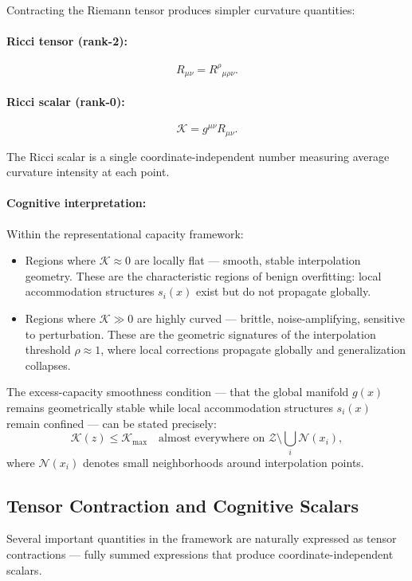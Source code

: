 \documentclass[12pt,a4paper]{article}
\begin{document}
Contracting the Riemann tensor produces simpler curvature quantities:

\paragraph{Ricci tensor (rank-2):}
\[
R_{\mu\nu} = R^\rho{}_{\mu\rho\nu}.
\]

\paragraph{Ricci scalar (rank-0):}
\[
\mathcal{K} = g^{\mu\nu} R_{\mu\nu}.
\]

The Ricci scalar is a single coordinate-independent number measuring average curvature intensity at each point.

\paragraph{Cognitive interpretation:} Within the representational capacity framework:
\begin{itemize}
\item Regions where $\mathcal{K} \approx 0$ are locally flat --- smooth, stable interpolation geometry. These are the characteristic regions of benign overfitting: local accommodation structures $s_i(x)$ exist but do not propagate globally.
\item Regions where $\mathcal{K} \gg 0$ are highly curved --- brittle, noise-amplifying, sensitive to perturbation. These are the geometric signatures of the interpolation threshold $\rho \approx 1$, where local corrections propagate globally and generalization collapses.
\end{itemize}

The excess-capacity smoothness condition --- that the global manifold $g(x)$ remains geometrically stable while local accommodation structures $s_i(x)$ remain confined --- can be stated precisely:
\[
\mathcal{K}(z) \leq \mathcal{K}_{\max} \quad \text{almost everywhere on } \mathcal{Z} \setminus \bigcup_i \mathcal{N}(x_i),
\]
where $\mathcal{N}(x_i)$ denotes small neighborhoods around interpolation points.

\subsection{Tensor Contraction and Cognitive Scalars}

Several important quantities in the framework are naturally expressed as tensor contractions --- fully summed expressions that produce coordinate-independent scalars.
\end{document}
